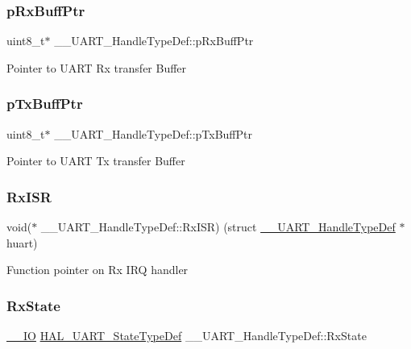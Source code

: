 \subsubsection{\texorpdfstring{pRxBuffPtr}{pRxBuffPtr}}
{\footnotesize\ttfamily uint8\+\_\+t$\ast$ \+\_\+\+\_\+\+U\+A\+R\+T\+\_\+\+Handle\+Type\+Def\+::p\+Rx\+Buff\+Ptr}

Pointer to U\+A\+RT Rx transfer Buffer \mbox{\label{struct_____u_a_r_t___handle_type_def_aab963198dfbbcf98902222de810fcc31}} 
\subsubsection{\texorpdfstring{pTxBuffPtr}{pTxBuffPtr}}
{\footnotesize\ttfamily uint8\+\_\+t$\ast$ \+\_\+\+\_\+\+U\+A\+R\+T\+\_\+\+Handle\+Type\+Def\+::p\+Tx\+Buff\+Ptr}

Pointer to U\+A\+RT Tx transfer Buffer \mbox{\label{struct_____u_a_r_t___handle_type_def_a7eb9527674b4a4315c0ad317bc2f4cd4}} 
\subsubsection{\texorpdfstring{RxISR}{RxISR}}
{\footnotesize\ttfamily void($\ast$ \+\_\+\+\_\+\+U\+A\+R\+T\+\_\+\+Handle\+Type\+Def\+::\+Rx\+I\+SR) (struct \mbox{\hyperlink{struct_____u_a_r_t___handle_type_def}{\+\_\+\+\_\+\+U\+A\+R\+T\+\_\+\+Handle\+Type\+Def}} $\ast$huart)}

Function pointer on Rx I\+RQ handler \mbox{\label{struct_____u_a_r_t___handle_type_def_a1b5639a73b305432afeb6aa18506d0fb}} 
\subsubsection{\texorpdfstring{RxState}{RxState}}
{\footnotesize\ttfamily \mbox{\hyperlink{core__sc300_8h_aec43007d9998a0a0e01faede4133d6be}{\+\_\+\+\_\+\+IO}} \mbox{\hyperlink{group___u_a_r_t___exported___types_ga94c58ae1f4dbcf6032224edfc93a6e19}{H\+A\+L\+\_\+\+U\+A\+R\+T\+\_\+\+State\+Type\+Def}} \+\_\+\+\_\+\+U\+A\+R\+T\+\_\+\+Handle\+Type\+Def\+::\+Rx\+State}

